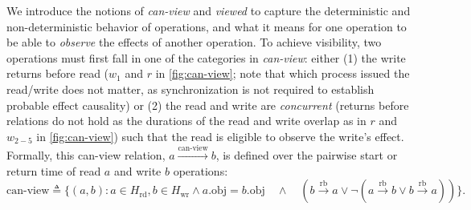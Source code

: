   We introduce the notions of \textit{can-view} and \textit{viewed}
  to capture the
  deterministic and non-deterministic behavior of operations,
  and what it means for one operation to be able to \textit{observe}
  the effects of another operation. To achieve visibility, two
  operations must first fall in one of
  the categories in \textit{can-view}: either (1) the write 
  returns before read (\eg $w_1$ and $r$ in \cref{fig:can-view}; 
  note that which process issued the read/write does not matter, as synchronization is not required to establish probable effect causality)
  or (2) the read and write are \textit{concurrent} (\ie returns before relations do not hold as the durations of the read and write overlap 
  as in $r$ and $w_{2-5}$ in \cref{fig:can-view}) such that the read is eligible to observe the write's effect.
  Formally, this can-view relation, $a \xrightarrow{\text{can-view}} b$,
  is defined over the pairwise start or return time of read $a$ and
  write $b$ operations:
  \begin{equation*}
	  \text{can-view} \triangleq \{(a, b) : a \in H_\text{rd}, b \in H_\text{wr} \land a.\text{obj} = b.\text{obj} \quad \land \quad (b \xrightarrow{\text{rb}} a
	  \lor \lnot(a \xrightarrow{\text{rb}} b \lor b \xrightarrow{\text{rb}} a))\}.
  \end{equation*}

